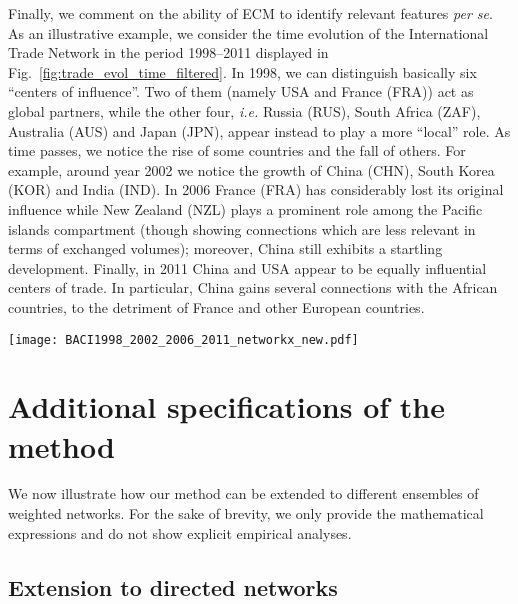 \documentclass[aps,twocolumn,superscriptaddress]{revtex4-1}
\newcommand{\ie}{\emph{i.e.} }
\begin{document}
Finally, we comment on the ability of ECM to identify relevant features \emph{per se}. As an illustrative example, we consider the time evolution of the International Trade Network in the period 1998--2011 displayed in Fig.~\ref{fig:trade_evol_time_filtered}. In 1998, we can distinguish basically six ``centers of influence''.
Two of them (namely USA and France (FRA)) act as global partners, while the other four, \ie Russia (RUS), South Africa (ZAF), Australia (AUS) and Japan (JPN), appear instead to play a more ``local'' role. As time passes, we notice the rise of some countries and the fall of others. For example, around year 2002 we notice the growth of China (CHN), South Korea (KOR) and India (IND). In 2006 France (FRA) has considerably lost its original influence while New Zealand (NZL) plays a prominent role among the Pacific islands compartment (though showing connections which are less relevant in terms of exchanged volumes); moreover, China still exhibits a startling development. Finally, in 2011 China and USA appear to be equally influential centers of trade. In particular, China gains several connections with the African countries, to the detriment of France and other European countries.
%
\begin{figure*}[t]
\centering
%
%
\texttt{[image: BACI1998\_2002\_2006\_2011\_networkx\_new.pdf]}
%	    
\caption{Time evolution of the International Trade Network, filtered according to the local ECM filter. Top left: 1998; top right: 2002; bottom left: 2006; bottom right: 2011. Figures refer to a critical $p$-value of $ 10^{-6} $.} 
\label{fig:trade_evol_time_filtered}
\end{figure*}
%


\section{Additional specifications of the method\label{sec:specifications}}
We now illustrate how our method can be extended to different ensembles of weighted networks. For the sake of brevity, we only provide the mathematical expressions and do not show explicit empirical analyses.

\subsection{Extension to directed networks}
\end{document}
